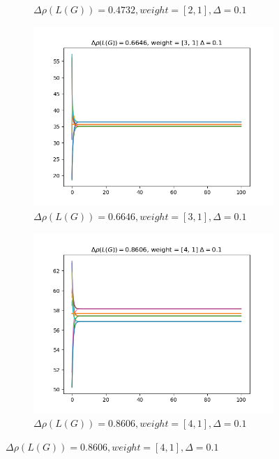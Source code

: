 \documentclass{article}
\begin{document}
\begin{problem}
\begin{figure}[!h]
\begin{subfigure}{0.45\textwidth}
            \caption{$\Delta \rho (L(G)) = 0.4732, weight = [2,1], \Delta = 0.1$}
        \end{subfigure}
        \begin{subfigure}{0.45\textwidth}
            \includegraphics[width=\textwidth]{./img/Figure_2.png}
            \caption{$\Delta \rho (L(G)) = 0.6646, weight = [3,1], \Delta = 0.1$ }
        \end{subfigure}
        \begin{subfigure}{0.45\textwidth}
            \includegraphics[width=\textwidth]{./img/Figure_3.png}
            \caption{$\Delta \rho (L(G)) = 0.8606, weight = [4,1], \Delta = 0.1$}
        \end{subfigure}
    \end{figure}

\end{problem}
\end{document}
